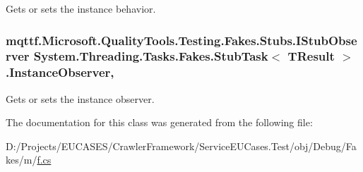 Gets or sets the instance behavior.

\hypertarget{class_system_1_1_threading_1_1_tasks_1_1_fakes_1_1_stub_task_3_01_t_result_01_4_aa43016c5bbd3a8c81e136a60b7b7b967}{
\subsubsection[{Instance\-Observer}]{\setlength{\rightskip}{0pt plus 5cm}mqttf.\-Microsoft.\-Quality\-Tools.\-Testing.\-Fakes.\-Stubs.\-I\-Stub\-Observer {\bf System.\-Threading.\-Tasks.\-Fakes.\-Stub\-Task}$<$ T\-Result $>$.Instance\-Observer\hspace{0.3cm}{\ttfamily [get]}, {\ttfamily [set]}}}\label{class_system_1_1_threading_1_1_tasks_1_1_fakes_1_1_stub_task_3_01_t_result_01_4_aa43016c5bbd3a8c81e136a60b7b7b967}


Gets or sets the instance observer.



The documentation for this class was generated from the following file\-:\begin{DoxyCompactItemize}
\item 
D\-:/\-Projects/\-E\-U\-C\-A\-S\-E\-S/\-Crawler\-Framework/\-Service\-E\-U\-Cases.\-Test/obj/\-Debug/\-Fakes/m/\hyperlink{m_2f_8cs}{f.\-cs}\end{DoxyCompactItemize}
